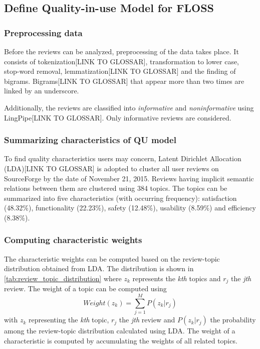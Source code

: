 \subsection*{Define Quality-in-use Model for FLOSS}

\subsubsection*{Preprocessing data}
Before the reviews can be analyzed, preprocessing of the data takes place. It consists of tokenization[LINK TO GLOSSAR], transformation to lower case, stop-word removal, lemmatization[LINK TO GLOSSAR] and the finding of bigrams. Bigrams[LINK TO GLOSSAR] that appear more than two times are linked by an underscore.

Additionally, the reviews are classified into \textit{informative} and \textit{noninformative} using LingPipe[LINK TO GLOSSAR]. Only informative reviews are considered.

\subsubsection*{Summarizing characteristics of QU model}
To find quality characteristics users may concern, Latent Dirichlet Allocation (LDA)[LINK TO GLOSSAR] is adopted to cluster all user reviews on SourceForge by the date of November 21, 2015. Reviews having implicit semantic relations between them are clustered using 384 topics. The topics can be summarized into five characteristics (with occurring frequency): satisfaction (48.32\%), functionality (22.23\%), safety (12.48\%), usability (8.59\%) and efficiency (8.38\%).

\subsubsection*{Computing characteristic weights}
The characteristic weights can be computed based on the review-topic distribution obtained from LDA. The distribution is shown in \autoref{tab:review_topic_distribution} where $z_k$ represents the \textit{kth} topics and $r_j$ the \textit{jth} review. The weight of a topic can be computed using
\begin{equation}\label{eqn:1}
    Weight(z_k) = \sum_{j=1}^{M} P(z_k|r_j)
\end{equation}
with $z_k$ representing the \textit{kth} topic, $r_j$ the \textit{jth} review and $P(z_k|r_j)$ the probability among the review-topic distribution calculated using LDA. The weight of a characteristic is computed by accumulating the weights of all related topics.

